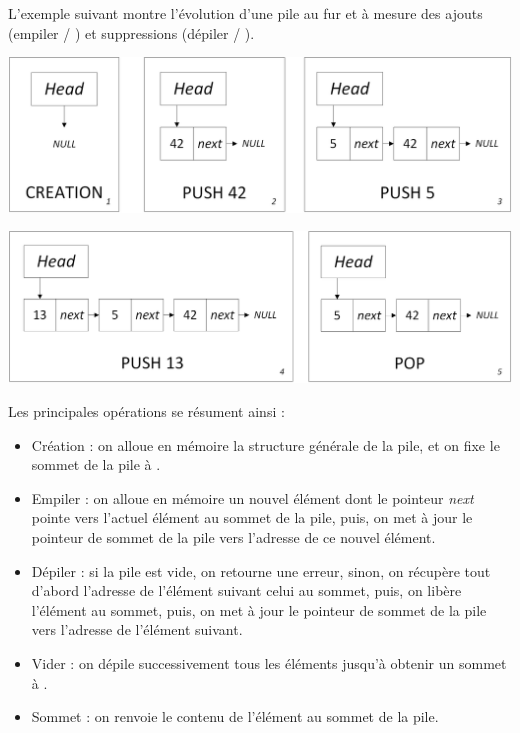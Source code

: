 L'exemple suivant montre l'évolution d'une pile au fur et à mesure des ajouts (empiler / ) et suppressions (dépiler / ).\\

\begin{center}
\includegraphics[scale=0.65]{Cours/Piles_4_Liste_Chainee_Usage_pack_1.png}
\end{center}

\begin{center}
\includegraphics[scale=0.65]{Cours/Piles_4_Liste_Chainee_Usage_pack_2.png}
\end{center}

\smallskip

Les principales opérations se résument ainsi :
\begin{itemize}
\item Création : on alloue en mémoire la structure générale de la pile, et on fixe le sommet de la pile à .
\item Empiler : on alloue en mémoire un nouvel élément dont le pointeur \textit{next} pointe vers l'actuel élément au sommet de la pile, puis, on met à jour le pointeur de sommet de la pile vers l'adresse de ce nouvel élément.
\item Dépiler : si la pile est vide, on retourne une erreur, sinon, on récupère tout d'abord l'adresse de l'élément suivant celui au sommet, puis, on libère l'élément au sommet, puis, on met à jour le pointeur de sommet de la pile vers l'adresse de l'élément suivant.
\item Vider : on dépile successivement tous les éléments jusqu'à obtenir un sommet à .
\item Sommet : on renvoie le contenu de l'élément au sommet de la pile.
\end{itemize}

